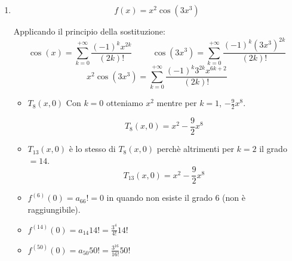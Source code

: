 \begin{exercise}
\begin{enumerate}
        \item \begin{equation*}f(x)=x^2\cos(3x^3)\end{equation*}
        
        Applicando il principio della sostituzione:
        \begin{equation*}
            \cos(x)=\sum^{+\infty}_{k=0}\frac{(-1)^kx^{2k}}{(2k)!}\hspace{1cm}\cos(3x^3)=\sum^{+\infty}_{k=0}\frac{(-1)^k(3x^3)^{2k}}{(2k)!}
        \end{equation*}
        \begin{equation*}
            x^2\cos(3x^3)=\sum^{+\infty}_{k=0}\frac{(-1)^k3^{2k}x^{6k+2}}{(2k)!}
        \end{equation*}
        
        \begin{itemize}
            \item $T_8(x,0)$ Con $k=0$ otteniamo $x^2$ mentre per $k=1$, $-\frac{9}{2}x^8$.
        
        \begin{equation*}
            T_8(x,0)=x^2-\frac{9}{2}x^8
        \end{equation*}
        
        \item $T_{13}(x,0)$ è lo stesso di $T_8(x,0)$ perchè altrimenti per $k=2$ il grado $=14$.
        \begin{equation*}
            T_{13}(x,0)=x^2-\frac{9}{2}x^8
        \end{equation*}
        
        \item $f^{(6)}(0)=a_66!=0$ in quando non esiste il grado 6 (non è raggiungibile).
        \item $f^{(14)}(0)=a_{14}14!=\frac{3^4}{4!}14!$
        \item $f^{(50)}(0)=a_{50}50!=\frac{3^{16}}{16!}50!$
        \end{itemize}
    \end{enumerate}
\end{exercise}
